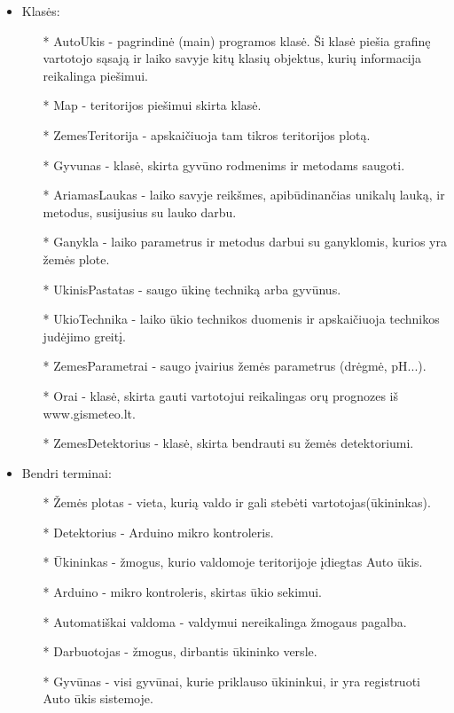 \documentclass[oneside]{VUMIFPSkursinis}
\begin{document}
\begin{itemize}
	\item Klasės:
		\begin{itemize}
			\item[*] AutoUkis - pagrindinė (main) programos klasė. Ši klasė piešia grafinę vartotojo sąsają ir laiko savyje kitų klasių objektus, kurių informacija reikalinga piešimui.
			\item[*] Map - teritorijos piešimui skirta klasė.
			\item[*] ZemesTeritorija - apskaičiuoja tam tikros teritorijos plotą.
 			\item[*] Gyvunas - klasė, skirta gyvūno rodmenims ir metodams saugoti.
			\item[*] AriamasLaukas - laiko savyje reikšmes, apibūdinančias unikalų lauką, ir metodus, susijusius su lauko darbu.
			\item[*] Ganykla - laiko parametrus ir metodus darbui su ganyklomis, kurios yra žemės plote.
			\item[*] UkinisPastatas - saugo ūkinę techniką arba gyvūnus.
			\item[*] UkioTechnika - laiko ūkio technikos duomenis ir apskaičiuoja technikos judėjimo greitį.
			\item[*] ZemesParametrai - saugo įvairius žemės parametrus (drėgmė, pH...).
			\item[*] Orai - klasė, skirta gauti vartotojui reikalingas orų prognozes iš www.gismeteo.lt.
			\item[*] ZemesDetektorius - klasė, skirta bendrauti su žemės detektoriumi.


		\end{itemize}
	\item Bendri terminai:
		\begin{itemize}
			\item[*] Žemės plotas - vieta, kurią valdo ir gali stebėti vartotojas(ūkininkas). 
			\item[*] Detektorius - Arduino mikro kontroleris.
			\item[*] Ūkininkas - žmogus, kurio valdomoje teritorijoje įdiegtas Auto ūkis.
			\item[*] Arduino - mikro kontroleris, skirtas ūkio sekimui.
			\item[*] Automatiškai valdoma - valdymui nereikalinga žmogaus pagalba.
			\item[*] Darbuotojas - žmogus, dirbantis ūkininko versle.
			\item[*] Gyvūnas - visi gyvūnai, kurie priklauso ūkininkui, ir yra registruoti Auto ūkis sistemoje.
		\end{itemize}
\end{itemize}
\end{document}

